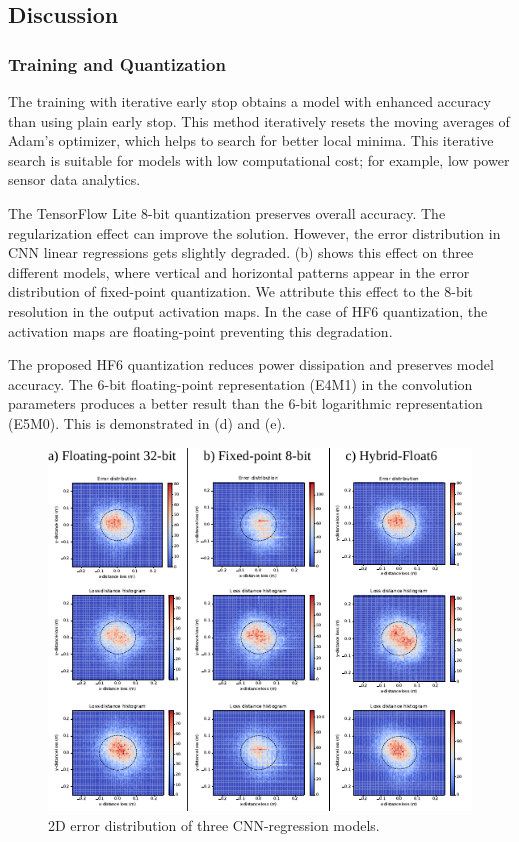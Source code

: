 \subsection{Discussion}
\subsubsection{Training and Quantization}
The training with iterative early stop obtains a model with enhanced accuracy than using plain early stop. This method iteratively resets the moving averages of Adam's optimizer, which helps to search for better local minima. This iterative search is suitable for models with low computational cost; for example, low power sensor data analytics.

The TensorFlow Lite 8-bit quantization preserves overall accuracy. The regularization effect can improve the solution. However, the error distribution in CNN linear regressions gets slightly degraded. (b) shows this effect on three different models, where vertical and horizontal patterns appear in the error distribution of fixed-point quantization. We attribute this effect to the 8-bit resolution in the output activation maps. In the case of HF6 quantization, the activation maps are floating-point preventing this degradation.

The proposed HF6 quantization reduces power dissipation and preserves model accuracy. The 6-bit floating-point representation (E4M1) in the convolution parameters produces a better result than the 6-bit logarithmic representation (E5M0). This is demonstrated in (d) and (e).

\begin{figure}[t!]
	\centering
	\includegraphics[width=1\columnwidth]{../figures/histograms/2D_error_distribtion.pdf}
	\caption{2D error distribution of three CNN-regression models.}
	\label{fig:2d_error_distribtion}
\end{figure}

